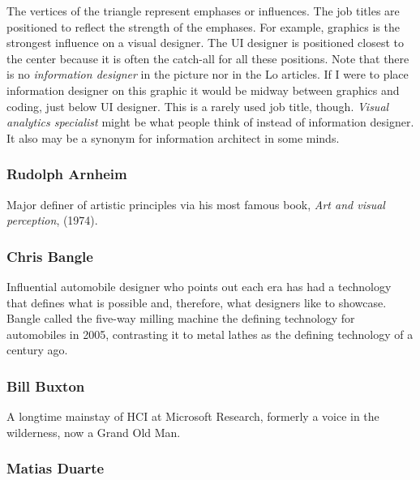 The vertices of the triangle represent emphases or influences. The job
titles are positioned to reflect the strength of the emphases. For
example, graphics is the strongest influence on a visual designer. The
UI designer is positioned closest to the center because it is often the
catch-all for all these positions. Note that there is no
\emph{information designer} in the picture nor in the Lo articles. If I
were to place information designer on this graphic it would be midway
between graphics and coding, just below UI designer. This is a rarely
used job title, though. \emph{Visual analytics specialist} might be what
people think of instead of information designer. It also may be a
synonym for information architect in some minds.

\hypertarget{people}{%
\label{people}}

\hypertarget{rudolph-arnheim}{%
\subsubsection{Rudolph Arnheim}\label{rudolph-arnheim}}

Major definer of artistic principles via his most famous book, \emph{Art
and visual perception}, (1974).

\hypertarget{chris-bangle}{%
\subsubsection{Chris Bangle}\label{chris-bangle}}

Influential automobile designer who points out each era has had a
technology that defines what is possible and, therefore, what designers
like to showcase. Bangle called the five-way milling machine the
defining technology for automobiles in 2005, contrasting it to metal
lathes as the defining technology of a century ago.

\hypertarget{bill-buxton}{%
\subsubsection{Bill Buxton}\label{bill-buxton}}

A longtime mainstay of HCI at Microsoft Research, formerly a voice in
the wilderness, now a Grand Old Man.

\hypertarget{matias-duarte}{%
\subsubsection{Matias Duarte}\label{matias-duarte}}

